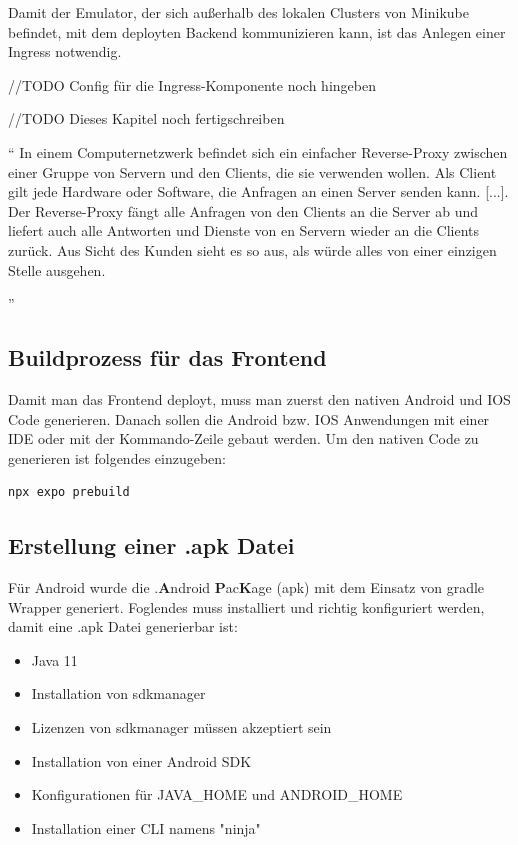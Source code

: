Damit der Emulator, der sich außerhalb des lokalen Clusters von Minikube befindet,
mit dem deployten Backend kommunizieren kann,
ist das Anlegen einer Ingress notwendig.

//TODO Config für die Ingress-Komponente noch hingeben

//TODO Dieses Kapitel noch fertigschreiben



``
In einem Computernetzwerk befindet sich ein einfacher Reverse-Proxy zwischen einer
Gruppe von Servern und den Clients, die sie verwenden wollen.
Als Client gilt jede Hardware oder Software, die Anfragen an einen Server senden kann. [...].
Der Reverse-Proxy fängt alle Anfragen von den Clients an die Server ab und liefert auch
alle Antworten und Dienste von
en Servern wieder an die Clients zurück. Aus Sicht des Kunden sieht es so aus,
als würde alles von einer einzigen Stelle ausgehen.

''
\cite{reverse-proxy}

\subsection{Buildprozess für das Frontend}

Damit man das Frontend deployt, muss man zuerst den nativen Android und IOS Code generieren.
Danach sollen die Android bzw. IOS Anwendungen mit einer IDE oder mit der Kommando-Zeile gebaut werden.
Um den nativen Code zu generieren ist folgendes einzugeben:
\begin{lstlisting}[language=Bash,caption=generate android and ios]
npx expo prebuild
\end{lstlisting}





\subsection{Erstellung einer .apk Datei}
Für Android wurde die .\textbf{A}ndroid \textbf{P}ac\textbf{K}age (apk)  mit dem Einsatz von gradle Wrapper generiert.
Foglendes muss installiert und richtig konfiguriert werden, damit  eine .apk Datei generierbar ist:



\begin{itemize}
  \item Java 11
  \item Installation von sdkmanager
  \item Lizenzen von sdkmanager müssen akzeptiert sein
  \item Installation von einer Android SDK
  \item Konfigurationen für JAVA\_HOME und ANDROID\_HOME
  \item Installation einer CLI namens "ninja"
\end{itemize}

